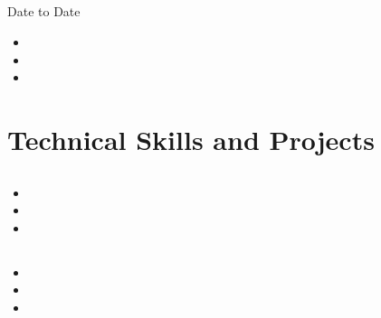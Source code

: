 \documentclass{article}
\def\topSeparation{2pt}
\def\itemSeparation{2pt}
\def\parSeparation{2pt}
\def\partopSeparation{2pt}
\begin{document}
\subsection{}
\subsubsection{}
 Date to Date

\begin{itemize}[topsep=\topSeparation,
                itemsep=\itemSeparation,
                parsep=\parSeparation,
                partopsep=\partopSeparation]
        
    \item{}

    \item{}

    \item{}

\end{itemize}

\section{Technical Skills and Projects}
\subsection{}

\vspace{.4em}

\begin{itemize}[topsep=\topSeparation,
                itemsep=\itemSeparation,
                parsep=\parSeparation,
                partopsep=\partopSeparation]

    \item{}

    \item{}

    \item{}

\end{itemize}

\subsection{}

\vspace{.4em}

\begin{itemize}[topsep=\topSeparation,
                itemsep=\itemSeparation,
                parsep=\parSeparation,
                partopsep=\partopSeparation]

    \item{}  

    \item{}

    \item{}

\end{itemize}
\end{document}
